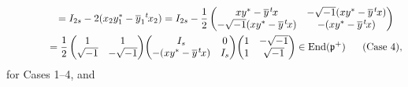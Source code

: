 \documentclass[pdftex]{sigma}
\numberwithin{equation}{section}
\newcommand{\fp}{\mathfrak{p}}
\newcommand{\End}{\operatorname{End}}
\begin{document}
\begin{gather*}
\hphantom{B(x_2,y_1)}{} =I_{2s}-2(x_2y^*_1-\overline{y}_1{}^t\hspace{-1pt}x_2)
=I_{2s}-\frac{1}{2}\begin{pmatrix}xy^*-\overline{y}\hspace{1pt}{}^t\hspace{-1pt}x &
-\sqrt{-1}(xy^*-\overline{y}\hspace{1pt}{}^t\hspace{-1pt}x) \\
-\sqrt{-1}(xy^*-\overline{y}\hspace{1pt}{}^t\hspace{-1pt}x) &
-(xy^*-\overline{y}\hspace{1pt}{}^t\hspace{-1pt}x) \end{pmatrix} \\
\hphantom{B(x_2,y_1)}{}
 =\frac{1}{2}\begin{pmatrix}1&1\\\sqrt{-1}&-\sqrt{-1}\end{pmatrix}\!
\begin{pmatrix}I_s& 0\\ -(xy^*-\overline{y}\hspace{1pt}{}^t\hspace{-1pt}x)& I_s\end{pmatrix}\!
\begin{pmatrix}1&-\sqrt{-1}\\1&\sqrt{-1}\end{pmatrix}\in\End(\fp^+)\qquad\!\! (\text{Case }4),
\end{gather*}
for Cases 1--4, and
\end{document}
